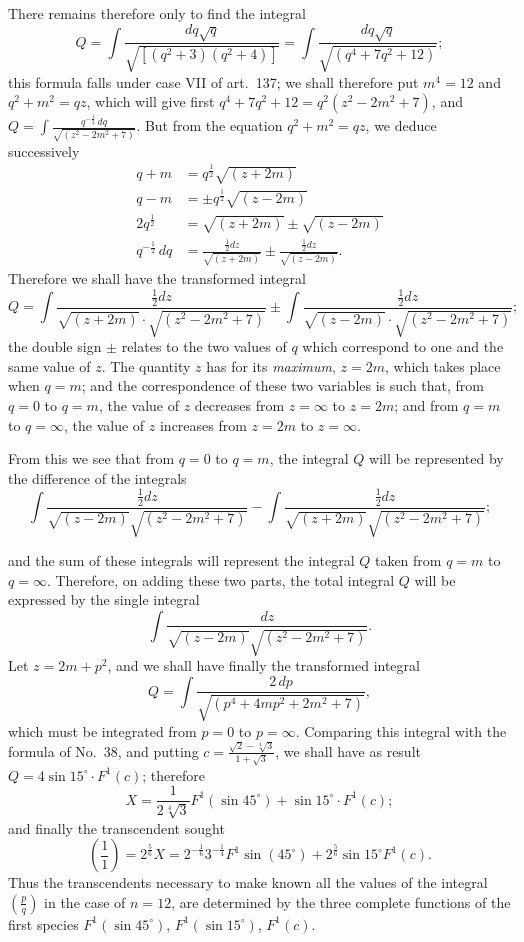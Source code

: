 \documentclass{article}
\begin{document}
There remains therefore only to find the integral
\[ Q=\int\frac{dq\sqrt{q}}{\sqrt{[(q^{2}+3)(q^{2}+4)]}}=\int\frac{dq\sqrt{q}}{\sqrt{(q^{4}+7q^{2}+12)}}; \]
this formula falls under case VII of art.\ 137; we shall therefore put $m^{4}=12$ and $q^{2}+m^{2}=qz$, which will give first $q^{4}+7q^{2}+12=q^{2}(z^{2}-2m^{2}+7)$, and $Q=\displaystyle\int\frac{q^{-\frac{1}{2}}\,dq}{\sqrt{(z^{2}-2m^{2}+7)}}$. But from the equation $q^{2}+m^{2}=qz$, we deduce successively
\[ \begin{aligned} q+m&=q^{\frac{1}{2}}\sqrt{(z+2m)}\\ q-m&=\pm q^{\frac{1}{2}}\sqrt{(z-2m)}\\ 2q^{\frac{1}{2}}&=\sqrt{(z+2m)}\pm\sqrt{(z-2m)}\\ q^{-\frac{1}{2}}\,dq&=\frac{\tfrac{1}{2}dz}{\sqrt{(z+2m)}}\pm\frac{\tfrac{1}{2}dz}{\sqrt{(z-2m)}}. \end{aligned} \]
Therefore we shall have the transformed integral
\[ Q=\int\frac{\tfrac{1}{2}dz}{\sqrt{(z+2m)}\cdot\sqrt{(z^{2}-2m^{2}+7)}}\pm\int\frac{\tfrac{1}{2}dz}{\sqrt{(z-2m)}\cdot\sqrt{(z^{2}-2m^{2}+7)}}; \]
the double sign $\pm$ relates to the two values of $q$ which correspond to one and the same value of $z$. The quantity $z$ has for its \emph{maximum}, $z=2m$, which takes place when $q=m$; and the correspondence of these two variables is such that, from $q=0$ to $q=m$, the value of $z$ decreases from $z=\infty$ to $z=2m$; and from $q=m$ to $q=\infty$, the value of $z$ increases from $z=2m$ to $z=\infty$.

From this we see that from $q=0$ to $q=m$, the integral $Q$ will be represented by the difference of the integrals
\[ \int\frac{\tfrac{1}{2}dz}{\sqrt{(z-2m)}\sqrt{(z^{2}-2m^{2}+7)}}-\int\frac{\tfrac{1}{2}dz}{\sqrt{(z+2m)}\sqrt{(z^{2}-2m^{2}+7)}}; \]

and the sum of these integrals will represent the integral $Q$ taken from $q=m$ to $q=\infty$. Therefore, on adding these two parts, the total integral $Q$ will be expressed by the single integral
\[ \int\frac{dz}{\sqrt{(z-2m)}\sqrt{(z^{2}-2m^{2}+7)}}. \]
Let $z=2m+p^{2}$, and we shall have finally the transformed integral
\[ Q=\int\frac{2\,dp}{\sqrt{(p^{4}+4mp^{2}+2m^{2}+7)}}, \]
which must be integrated from $p=0$ to $p=\infty$. Comparing this integral with the formula of No.~38, and putting $c=\frac{\sqrt{2}-\sqrt[4]{3}}{1+\sqrt{3}}$, we shall have as result $Q=4\sin 15^{\circ}\cdot F^{1}(c)$; therefore
\[ X=\frac{1}{2\sqrt[4]{3}}F^{1}(\sin 45^{\circ})+\sin 15^{\circ}\cdot F^{1}(c); \]
and finally the transcendent sought
\[ \left(\frac{1}{1}\right)=2^{\frac{5}{6}}X=2^{-\frac{1}{6}}3^{-\frac{1}{4}}F^{1}\sin(45^{\circ})+2^{\frac{5}{6}}\sin 15^{\circ}F^{1}(c). \]
Thus the transcendents necessary to make known all the values of the integral $\left(\frac{p}{q}\right)$ in the case of $n=12$, are determined by the three complete functions of the first species $F^{1}(\sin 45^{\circ})$, $F^{1}(\sin 15^{\circ})$, $F^{1}(c)$.
\end{document}
